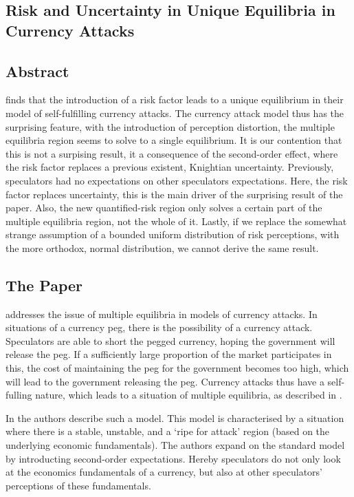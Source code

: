 \begin{refsection}
\chapter{Risk and Uncertainty in Unique Equilibria in Currency Attacks}
\label{unc}
\section*{Abstract}
\textcite{morris1998unique} finds that the introduction of a risk factor leads to a unique equilibrium in their model of self-fulfilling currency attacks. The currency attack model thus has the surprising feature, with the introduction of perception distortion, the multiple equilibria region seems to solve to a single equilibrium. It is our contention that this is not a surpising result, it a consequence of the second-order effect, where the risk factor replaces a previous existent, Knightian uncertainty. Previously, speculators had no expectations on other speculators expectations. Here, the risk factor replaces uncertainty, this is the main driver of the surprising result of the paper. Also, the new quantified-risk region only solves a certain part of the multiple equilibria region, not the whole of it. Lastly, if we replace the somewhat strange assumption of a bounded uniform distribution of risk perceptions, with the more orthodox, normal distribution, we cannot derive the same result.
\pagebreak

\section{The Paper}
\label{unc:idea}
\textcite{morris1998unique} addresses the issue of multiple equilibria in models of currency attacks.
In situations of a currency peg, there is the possibility of a currency attack.
Speculators are able to short the pegged currency, hoping the government will release the peg.
If a sufficiently large proportion of the market participates in this,
the cost of maintaining the peg for the government becomes too high,
which will lead to the government releasing the peg.
Currency attacks thus have a self-fulling nature,
which leads to a situation of multiple equilibria,
as described in \textcite{obstfeld1986rational,obstfeld1995logic,obstfeld1996models}.

In \textcite{morris1998unique} the authors describe such a model.
This model is characterised by a situation where there is a stable, unstable,
and a `ripe for attack' region (based on the underlying economic fundamentals).
The authors expand on the standard model by introducting second-order expectations.
Hereby speculators do not only look at the economics fundamentals of a currency,
but also at other speculators' perceptions of these fundamentals.


\end{refsection}
